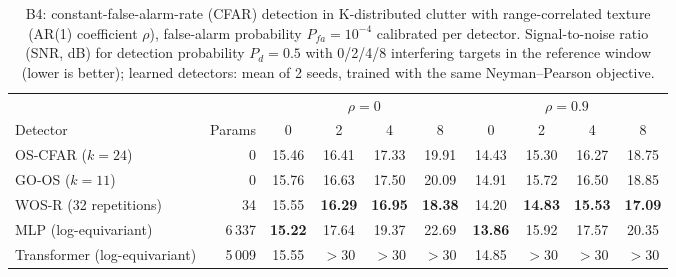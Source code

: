 \begin{table}[t]\centering\small
\caption{B4: constant-false-alarm-rate (CFAR) detection in K-distributed clutter with range-correlated texture (AR(1) coefficient $\rho$), false-alarm probability $P_{fa}=10^{-4}$ calibrated per detector. Signal-to-noise ratio (SNR, dB) for detection probability $P_d=0.5$ with 0/2/4/8 interfering targets in the reference window (lower is better); learned detectors: mean of 2 seeds, trained with the same Neyman--Pearson objective.}\label{tab:b4}
\setlength{\tabcolsep}{4pt}\begin{tabular}{lr|cccc|cccc}\toprule
& & \multicolumn{4}{c|}{$\rho=0$} & \multicolumn{4}{c}{$\rho=0.9$}\\
Detector & Params & 0 & 2 & 4 & 8 & 0 & 2 & 4 & 8\\\midrule
OS-CFAR ($k{=}24$) & 0 & 15.46 & 16.41 & 17.33 & 19.91 & 14.43 & 15.30 & 16.27 & 18.75\\
GO-OS ($k{=}11$) & 0 & 15.76 & 16.63 & 17.50 & 20.09 & 14.91 & 15.72 & 16.50 & 18.85\\
WOS-R (32 repetitions) & 34 & 15.55 & \textbf{16.29} & \textbf{16.95} & \textbf{18.38} & 14.20 & \textbf{14.83} & \textbf{15.53} & \textbf{17.09}\\
MLP (log-equivariant) & 6\,337 & \textbf{15.22} & 17.64 & 19.37 & 22.69 & \textbf{13.86} & 15.92 & 17.57 & 20.35\\
Transformer (log-equivariant) & 5\,009 & 15.55 & $>30$ & $>30$ & $>30$ & 14.85 & $>30$ & $>30$ & $>30$\\
\bottomrule\end{tabular}\end{table}